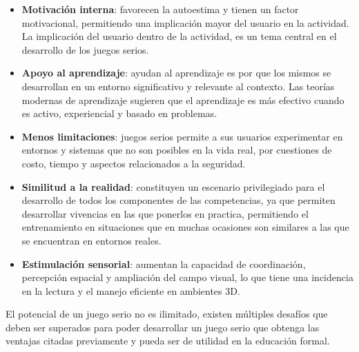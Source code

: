 \begin{itemize}

\item \textbf{Motivación interna}: favorecen la autoestima y tienen un factor
    motivacional\cite{guenaga2013serious}, permitiendo una implicación mayor del
    usuario en la actividad\cite{sg:aoverview}. La implicación del usuario
    dentro de la actividad, es un tema central en el desarrollo de los juegos
    serios\cite{charsky:2010}.

\item \textbf{Apoyo al aprendizaje}: ayudan al aprendizaje es por que los mismos
    se desarrollan en un entorno significativo y relevante al
    contexto\cite{sg:aoverview}. Las teorías modernas de aprendizaje sugieren
    que el aprendizaje es más efectivo cuando es activo, experiencial y basado
    en problemas\cite{guenaga2013serious}.

\item \textbf{Menos limitaciones}: juegos serios permite a sus usuarios
    experimentar en entornos y sistemas que no son posibles en la vida real, por
    cuestiones de costo, tiempo y aspectos relacionados a la
    seguridad\cite{sg:aoverview}.

\item \textbf{Similitud a la realidad}: constituyen un escenario privilegiado
    para el desarrollo de todos los componentes de las competencias, ya que
    permiten desarrollar vivencias en las que ponerlos en practica, permitiendo
    el entrenamiento en situaciones que en muchas ocasiones son similares a las
    que se encuentran en entornos reales\cite{guenaga2013serious,sg:aoverview}.
    
\item \textbf{Estimulación sensorial}: aumentan la capacidad de coordinación,
    percepción espacial y ampliación del campo visual, lo que tiene una
    incidencia en la lectura y el manejo eficiente en ambientes
    3D\cite{guenaga2013serious}. 

\end{itemize}

El potencial de un juego serio no es ilimitado, existen múltiples desafíos que
deben ser superados para poder desarrollar un juego serio que obtenga las
ventajas citadas previamente y pueda ser de utilidad en la educación formal.


